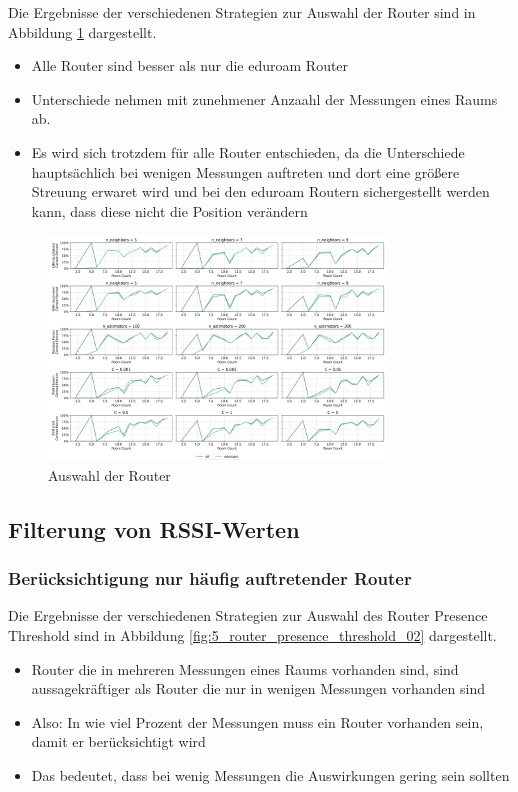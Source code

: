 Die Ergebnisse der verschiedenen Strategien zur Auswahl der Router sind in Abbildung \ref{fig:4_router_selection_02} dargestellt.

\begin{itemize}
    \item Alle Router sind besser als nur die eduroam Router
    \item Unterschiede nehmen mit zunehmener Anzaahl der Messungen eines Raums ab.
    \item Es wird sich trotzdem für alle Router entschieden, da die Unterschiede hauptsächlich bei wenigen Messungen auftreten und dort eine größere Streuung erwaret wird und bei den eduroam Routern sichergestellt werden kann, dass diese nicht die Position verändern
\end{itemize}

\begin{figure}[H]
    \centering
    \includegraphics[width=0.8\textwidth]{images/4_router_selection_02.png}
    \caption{Auswahl der Router}
    \label{fig:4_router_selection_02}
\end{figure}

\subsection{Filterung von RSSI-Werten}
\subsubsection{Berücksichtigung nur häufig auftretender Router}

Die Ergebnisse der verschiedenen Strategien zur Auswahl des Router Presence Threshold sind in Abbildung \ref{fig:5_router_presence_threshold_02} dargestellt.

\begin{itemize}
    \item Router die in mehreren Messungen eines Raums vorhanden sind, sind aussagekräftiger als Router die nur in wenigen Messungen vorhanden sind
    \item Also: In wie viel Prozent der Messungen muss ein Router vorhanden sein, damit er berücksichtigt wird
    \item Das bedeutet, dass bei wenig Messungen die Auswirkungen gering sein sollten
\end{itemize}

